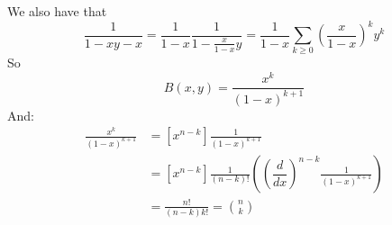 \documentclass[]{article}
\theoremstyle{definition}
\numberwithin{theorem}{section}
\numberwithin{equation}{section}
\begin{document}
We also have that
\begin{equation}
	\frac{1}{1-xy-x} = \frac{1}{1-x} \frac{1}{1 - \frac{x}{1-x} y} = \frac{1}{1-x} \sum_{k \geq 0}\left(\frac{x}{1-x}\right)^k y^k
\end{equation}
So \begin{equation}
	[y^k] B(x,y) = \frac{x^k}{(1-x)^{k+1}}
\end{equation}
And:
\begin{align*}
	[x^n] \frac{x^k}{(1-x)^{k+1}} &= [x^{n-k}]\frac{1}{(1-x)^{k+1}}\\
	&= [x^{n-k}]\frac{1}{(n-k)!}\left( \left(\dfrac{d}{dx}\right)^{n-k} \frac{1}{(1-x)^{k+1}}  \right)\\
	&= \frac{n!}{(n-k) k!} = \binom{n}{k}
\end{align*}
\end{document}
